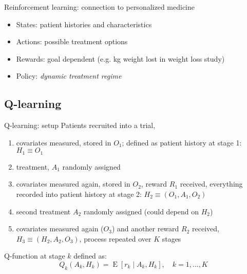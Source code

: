 \documentclass[handout]{beamer}
\begin{document}
\begin{frame}[c]{Reinforcement learning: connection to personalized medicine}
  
  \begin{itemize}[<+->]
      \item States: patient histories and characteristics
      \item Actions: possible treatment options
      \item Rewards: goal dependent (e.g. kg weight lost in weight loss study)
      \item Policy: \emph{dynamic treatment regime} 
  \end{itemize}

\end{frame}

\subsection{Q-learning} %
\label{sub:q_learning}



\begin{frame}{Q-learning: setup}
  Patients recruited into a trial,
  \begin{enumerate}[<+(1)->]
    \item covariates measured, stored in $O_{1}$; defined as patient history at stage 1: $H_{1} \equiv O_{1}$
    \item treatment, $A_{1}$ randomly assigned
    \item covariates measured again, stored in $O_{2}$, reward $R_{1}$ received, everything recorded into patient history at stage 2: $H_{2} \equiv (O_{1}, A_{1}, O_{2})$
    \item second treatment $A_{2}$ randomly assigned (could depend on $H_{2}$)
    \item covariates measured again ($O_{3}$) and another reward $R_{2}$ received, $H_{3} \equiv (H_{2}, A_{2}, O_{3})$, process repeated over $K$ stages
  \end{enumerate}
    \pause
Q-function at stage $k$ defined as:
  \begin{equation*}
     Q_{k}(A_{k}, H_{k})  = \operatorname{E}[r_{k} \mid A_{k}, H_{k}], \quad k = 1, \ldots, K
  \end{equation*}
\end{frame}
\end{document}
